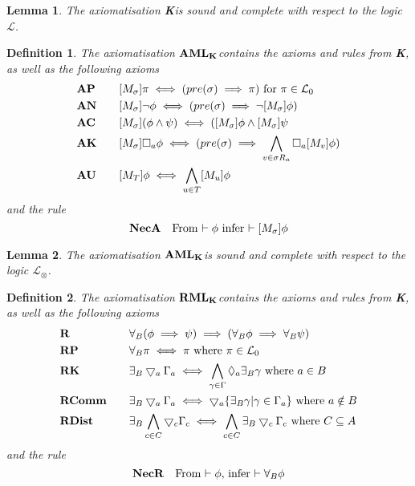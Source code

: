 \documentclass[12pt, a4paper, titlepage]{scrartcl}
\newtheorem{defn}{Definition}[subsection]
\newtheorem{lemma}{Lemma}[subsection]
\numberwithin{equation}{section}
\newcommand{\cover}{\bigtriangledown}
\newcommand{\sqex}[1]{[{#1}]}
\newcommand{\lang}{\mathcal{L}}
\newcommand{\langActEx}{\lang_{\otimes}}
\newcommand{\langProp}{\lang_0}
\newcommand{\AXK}{{\bf K}}
\newcommand{\AXAML}{${\bf AML_{\AXK}}$}
\newcommand{\AXRML}{${\bf RML_{\AXK}}$}
\newcommand{\axAN}{{\bf AN}}
\newcommand{\axAP}{{\bf AP}}
\newcommand{\axAC}{{\bf AC}}
\newcommand{\axAK}{{\bf AK}}
\newcommand{\axAU}{{\bf AU}}
\newcommand{\axNecA}{{\bf NecA}}
\newcommand{\axR}{{\bf R}}
\newcommand{\axRP}{{\bf RP}}
\newcommand{\axRK}{{\bf RK}}
\newcommand{\axRComm}{{\bf RComm}}
\newcommand{\axRDist}{{\bf RDist}}
\newcommand{\axNecR}{{\bf NecR}}
\begin{document}
\begin{lemma} \label{axiomKSoundComplete}
The axiomatisation \AXK is sound and complete with respect to the logic $\lang$.
\end{lemma}

\begin{defn} \label{axiomAML}
The axiomatisation \AXAML contains the axioms and rules from \AXK, as well as the following axioms
\begin{alignat*}{2}
	& \axAP && \quad \sqex{M_\sigma}\pi \iff (pre(\sigma) \implies \pi) \text{ for $\pi \in \langProp$}\\
	& \axAN && \quad \sqex{M_\sigma} \neg \phi \iff (pre(\sigma) \implies \neg \sqex{M_\sigma} \phi)\\
	& \axAC && \quad \sqex{M_\sigma}(\phi \land \psi) \iff (\sqex{M_\sigma}\phi \land \sqex{M_\sigma}\psi\\
	& \axAK && \quad \sqex{M_\sigma}\Box_a\phi \iff (pre(\sigma) \implies \bigwedge_{v \in \sigma R_a}
		\Box_a \sqex{M_v} \phi) \\
	& \axAU && \quad \sqex{M_T} \phi \iff \bigwedge_{u \in T} \sqex{M_u} \phi
\end{alignat*}
and the rule
\[
	\axNecA \quad \text{From $\vdash \phi$ infer $\vdash \sqex{M_\sigma} \phi$}
\]
\end{defn}

\begin{lemma} \label{axiomAMLSoundComplete}
The axiomatisation \AXAML is sound and complete with respect to the logic $\langActEx$.
\end{lemma}

\begin{defn} \label{axiomRML}
The axiomatisation \AXRML contains the axioms and rules from \AXK, as well as the following axioms
\begin{alignat*}{2}
	& \axR && \quad \forall_B (\phi \implies \psi) \implies (\forall_B \phi \implies \forall_B \psi) \\
	& \axRP && \quad \forall_B \pi \iff \pi \text{ where } \pi \in \langProp \\
	& \axRK && \quad\exists_B \cover_a \Gamma_a \iff \bigwedge_{\gamma \in \Gamma} \Diamond_a \exists_B
	\gamma \text{ where } a \in B \\
	& \axRComm && \quad \exists_B \cover_a \Gamma_a \iff \cover_a \{ \exists_B \gamma | \gamma \in
	\Gamma_a\} \text{ where } a \notin B\\
	& \axRDist && \quad \exists_B \bigwedge_{c \in C} \cover_c \Gamma_c \iff \bigwedge_{c \in C}
	\exists_B \cover_c \Gamma_c \text{ where } C \subseteq A
\end{alignat*}
and the rule
\[
	\axNecR \quad \text{From $\vdash \phi$, infer $\vdash \forall_B \phi$}
\]
\end{defn}
\end{document}
